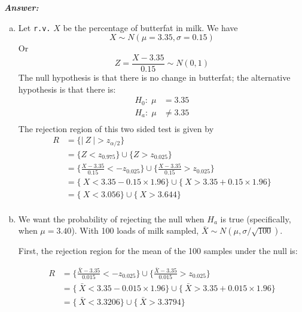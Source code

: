 \documentclass[12pt]{article}
\begin{document}
  \textbf{\color{TealBlue}\emph{Answer:} } 
 \begin{enumerate}[(a)]  
\item Let \texttt{r.v.} $X$ be the percentage of butterfat in milk.  We have
$$
X \sim N(\mu = 3.35, \sigma = 0.15)
$$
Or
$$
Z = \frac{X - 3.35}{0.15} \sim N(0,1)
$$
The null hypothesis is that there is no change in butterfat; the alternative hypothesis is that there is:
\begin{align*}
H_0 : \; \mu &= 3.35 \\
H_a : \; \mu &\neq 3.35\\
\end{align*}
The rejection region of this two sided test is given by 
\begin{align*}
R &= \Big\{ |\ Z \ | > z_{\alpha / 2} \Big\}  \\
&= \Big\{ Z < z_{0.975} \Big\} \cup \Big\{ Z >  z_{0.025} \Big\} \\
&= \Big\{  \frac{X - 3.35}{0.15} < - z_{0.025} \Big\}   \cup \Big\{  \frac{X - 3.35}{0.15} >  z_{0.025} \Big\} \\
&= \Big\{  \ X < 3.35 - 0.15 \times 1.96 \Big\}  \cup \Big\{ \ X >  3.35 + 0.15 \times 1.96 \Big\} \\
&= \Big\{  \ X < 3.056  \Big\}  \cup \Big\{ \ X > 3.644 \Big\} \\
\end{align*}

\item We want the probability of rejecting the null when $H_a$ is true (specifically, when $\mu = 3.40$). With 100 loads of milk sampled, $\bar X \sim N(\mu, \sigma / \sqrt{ 100})$. 

First, the rejection region for the mean of the 100 samples under the null is:

\begin{align*}
R &= \Big\{  \frac{\bar X - 3.35}{0.015} < - z_{0.025} \Big\}   \cup \Big\{  \frac{\bar X - 3.35}{0.015} >  z_{0.025} \Big\} \\
&= \Big\{  \ \bar X < 3.35 - 0.015 \times 1.96 \Big\}  \cup \Big\{ \ \bar X >  3.35 + 0.015 \times 1.96 \Big\} \\
&= \Big\{  \ \bar X < 3.3206  \Big\}  \cup \Big\{ \ \bar X > 3.3794 \Big\} \\
\end{align*}


\end{enumerate}
\end{document}
